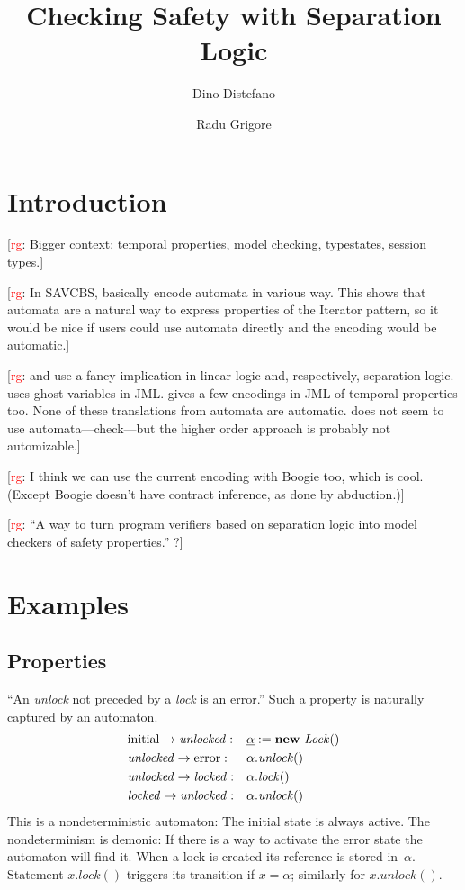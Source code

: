\documentclass[a4paper]{article}
\title{Checking Safety with Separation Logic}
\author{Dino Distefano \and Radu Grigore}
\newcommand{\todo}[2]{{\small [\textcolor{red}{#1}: #2]}}
\newcommand{\rg}[1]{\todo{rg}{#1}}
\newcommand{\pat}{\underline}
\newcommand{\new}[1]{\text{\textbf{new} \textit{#1}}}
\theoremstyle{remark}
\begin{document}
\maketitle
\section{Introduction} %

\rg{Bigger context: temporal properties, model checking, typestates, session types.}

\rg{In SAVCBS, \cite{cok2006,bierhoff2006} basically encode automata in various way. This shows that automata are a natural way to express properties of the Iterator pattern, so it would be nice if users could use automata directly and the encoding would be automatic.}

\rg{\cite{bierhoff2006} and \cite{haack2009} use a fancy implication in linear logic and, respectively, separation logic. \cite{cok2006} uses ghost variables in JML. \cite{trentelman2002} gives a few encodings in JML of temporal properties too. None of these translations from automata are automatic. \cite{krishnaswami2006} does not seem to use automata---check---but the higher order approach is probably not automizable.}

\rg{I think we can use the current encoding with Boogie too, which is cool. (Except Boogie doesn't have contract inference, as done by abduction.)}

\rg{``A way to turn program verifiers based on separation logic into model checkers of safety properties.'' ?}

\section{Examples} %
\subsection{Properties}\label{sec:properties} %

``An \textit{unlock} not preceded by a \textit{lock} is an error.''
Such a property is naturally captured by an automaton.
\begin{equation}\label{eq:unlockunlock}
\begin{aligned}
&\mathrm{initial}\to\mathit{unlocked}: &&\pat\alpha := \new{Lock}()\\
&\mathit{unlocked}\to\mathrm{error}: &&\alpha.\mathit{unlock}()\\
&\mathit{unlocked}\to\mathit{locked}: &&\alpha.\mathit{lock}()\\
&\mathit{locked}\to\mathit{unlocked}: &&\alpha.\mathit{unlock}()
\end{aligned}
\end{equation}
This is a nondeterministic automaton: 
The initial state is always active.
The nondeterminism is demonic:
If there is a way to activate the error state the automaton will find it.
When a lock is created its reference is stored in~$\alpha$.
Statement $x.\mathit{lock}()$ triggers its transition if $x=\alpha$;
similarly for $x.\mathit{unlock}()$.
\end{document}
